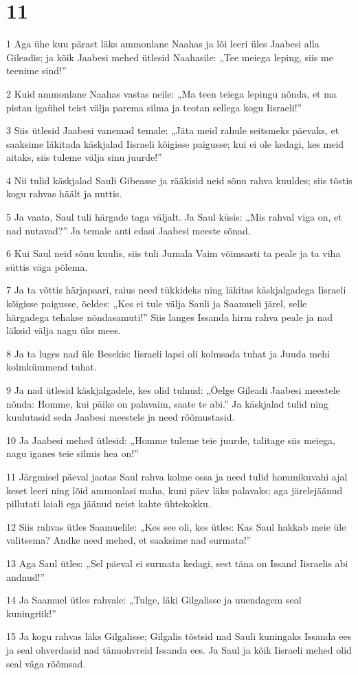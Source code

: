 \chapter{11}

\par 1 Aga ühe kuu pärast läks ammonlane Naahas ja lõi leeri üles Jaabesi alla Gileadis; ja kõik Jaabesi mehed ütlesid Naahasile: „Tee meiega leping, siis me teenime sind!”
\par 2 Kuid ammonlane Naahas vastas neile: „Ma teen teiega lepingu nõnda, et ma pistan igaühel teist välja parema silma ja teotan sellega kogu Iisraeli!”
\par 3 Siis ütlesid Jaabesi vanemad temale: „Jäta meid rahule seitsmeks päevaks, et saaksime läkitada käskjalad Iisraeli kõigisse paigusse; kui ei ole kedagi, kes meid aitaks, siis tuleme välja sinu juurde!”
\par 4 Nii tulid käskjalad Sauli Gibeasse ja rääkisid neid sõnu rahva kuuldes; siis tõstis kogu rahvas häält ja nuttis.
\par 5 Ja vaata, Saul tuli härgade taga väljalt. Ja Saul küsis: „Mis rahval viga on, et nad nutavad?” Ja temale anti edasi Jaabesi meeste sõnad.
\par 6 Kui Saul neid sõnu kuulis, siis tuli Jumala Vaim võimsasti ta peale ja ta viha süttis väga põlema.
\par 7 Ja ta võttis härjapaari, raius need tükkideks ning läkitas käskjalgadega Iisraeli kõigisse paigusse, öeldes: „Kes ei tule välja Sauli ja Saamueli järel, selle härgadega tehakse nõndasamuti!” Siis langes Issanda hirm rahva peale ja nad läksid välja nagu üks mees.
\par 8 Ja ta luges nad üle Besekis: Iisraeli lapsi oli kolmsada tuhat ja Juuda mehi kolmkümmend tuhat.
\par 9 Ja nad ütlesid käskjalgadele, kes olid tulnud: „Öelge Gileadi Jaabesi meestele nõnda: Homme, kui päike on palavaim, saate te abi.” Ja käskjalad tulid ning kuulutasid seda Jaabesi meestele ja need rõõmustasid.
\par 10 Ja Jaabesi mehed ütlesid: „Homme tuleme teie juurde, talitage siis meiega, nagu iganes teie silmis hea on!”
\par 11 Järgmisel päeval jaotas Saul rahva kolme ossa ja need tulid hommikuvahi ajal keset leeri ning lõid ammonlasi maha, kuni päev läks palavaks; aga järelejäänud pillutati laiali ega jäänud neist kahte ühtekokku.
\par 12 Siis rahvas ütles Saamuelile: „Kes see oli, kes ütles: Kas Saul hakkab meie üle valitsema? Andke need mehed, et saaksime nad surmata!”
\par 13 Aga Saul ütles: „Sel päeval ei surmata kedagi, sest täna on Issand Iisraelis abi andnud!”
\par 14 Ja Saamuel ütles rahvale: „Tulge, läki Gilgalisse ja uuendagem seal kuningriik!”
\par 15 Ja kogu rahvas läks Gilgalisse; Gilgalis tõstsid nad Sauli kuningaks Issanda ees ja seal ohverdasid nad tänuohvreid Issanda ees. Ja Saul ja kõik Iisraeli mehed olid seal väga rõõmsad.

